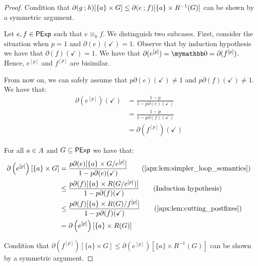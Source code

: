 \begin{proof}
    Condition that $\partial(g \mathbin{;} h)[\{a\} \times G] \leq \partial(e \mathbin{;} f)[\{a\} \times R^{-1}(G)]$ can be shown by a symmetric argument.

    \item[]  Let $e,f \in \mathsf{PExp}$ such that $e\equiv_b f$. We distinguish two subcases. First, consider the situation when $p=1$ and $\partial(e)(\checkmark)=1$. Observe that by induction hypothesis we have that $\partial(f)(\checkmark)=1$.
   	We have that $\partial(e^{[p]}) = \emptydist = \partial(f^{[p]})$. Hence, $e^{[p]}$ and $f^{[p]}$ are bisimilar.

    From now on, we can safely assume that $p\partial(e)(\checkmark)\neq 1$ and $p\partial(f)(\checkmark)\neq 1$. We have that:
    \begin{align*}
        \partial \left( e^{[p]} \right) (\checkmark) &= \frac{1-p}{1-p\partial(e)(\checkmark)} \\
        &= \frac{1-p}{1-p\partial(f)(\checkmark)} \tag{Induction hypothesis}\\
        &= \partial \left( f^{[p]} \right) (\checkmark)
    \end{align*}

    For all $a \in {A}$ and $G \subseteq \mathsf{PExp}$ we have that:
    \begin{align*}
        \partial \left( e^{[p]} \right)[\{a\} \times G] &= \frac{p\partial(e)[\{a\}\times {{G}/{e^{[p]}}}]}{1-p\partial(e)(\checkmark)} \tag{\Cref{apx:lem:simpler_loop_semantics}} \\
        &\leq \frac{p\partial(f)[\{a\}\times R({{G}/{e^{[p]}}})]}{1-p\partial(f)(\checkmark)} \tag{Induction hypothesis}\\
        &\leq \frac{p\partial(f)[\{a\}\times {{R(G)}/{f^{[p]}}}]}{1-p\partial(f)(\checkmark)} \tag{\Cref{apx:lem:cutting_postfixes}} \\
        &= \partial \left( e^{[p]} \right)[\{a\} \times R(G)]
    \end{align*}

    Condition that $\partial\left(f^{[p]}\right)[\{a\} \times G] \leq \partial\left(e^{[p]}\right)[\{a\} \times R^{-1}(G)]$ can be shown by a symmetric argument.
\end{proof}


